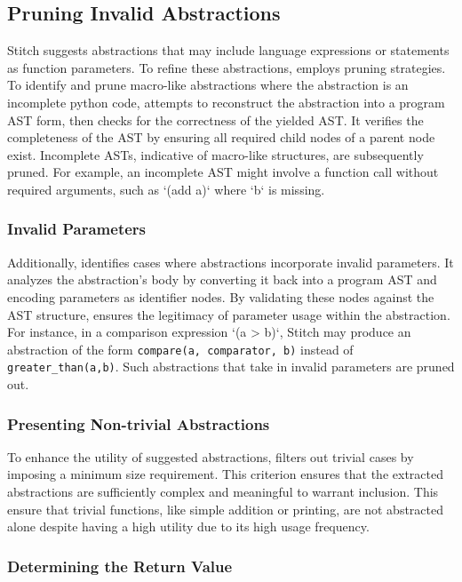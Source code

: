 \subsection{Pruning Invalid Abstractions}
Stitch suggests abstractions that may include language expressions or statements as function parameters. To refine these abstractions, \toolname employs pruning strategies.
To identify and prune macro-like abstractions where the abstraction is an incomplete python code, \toolname attempts to reconstruct the abstraction into a program AST form, then checks for the correctness of the yielded AST. It verifies the completeness of the AST by ensuring all required child nodes of a parent node exist. Incomplete ASTs, indicative of macro-like structures, are subsequently pruned. For example, an incomplete AST might involve a function call without required arguments, such as `(add a)` where `b` is missing. 

\subsubsection{Invalid Parameters}

Additionally, \toolname identifies cases where abstractions incorporate invalid parameters. It analyzes the abstraction’s body by converting it back into a program AST and encoding parameters as identifier nodes. By validating these nodes against the AST structure, \toolname ensures the legitimacy of parameter usage within the abstraction. For instance, in a comparison expression `(a > b)`, Stitch may produce an abstraction of the form \texttt{compare(a, comparator, b)} instead of \texttt{greater\_than(a,b)}. Such abstractions that take in invalid parameters are pruned out. 

\subsubsection{Presenting Non-trivial Abstractions}

To enhance the utility of suggested abstractions, \toolname filters out trivial cases by imposing a minimum size requirement. This criterion ensures that the extracted abstractions are sufficiently complex and meaningful to warrant inclusion. This ensure that trivial functions, like simple addition or printing, are not abstracted alone despite having a high utility due to its high usage frequency. 

\subsubsection{Determining the Return Value}

